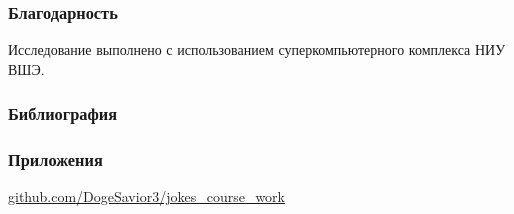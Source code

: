 \documentclass[aspectratio=169]{beamer}
\begin{document}
\begin{frame}
\frametitle{Благодарность}
	Исследование выполнено с использованием суперкомпьютерного комплекса НИУ ВШЭ. \cite{kostenetskiy_hpc_2021}
\end{frame}

\begin{frame}
\frametitle{Библиография}
	 
	 
\end{frame}

\begin{frame}
\frametitle{Приложения}
	\url{github.com/DogeSavior3/jokes_course_work}
\end{frame}
\end{document}
